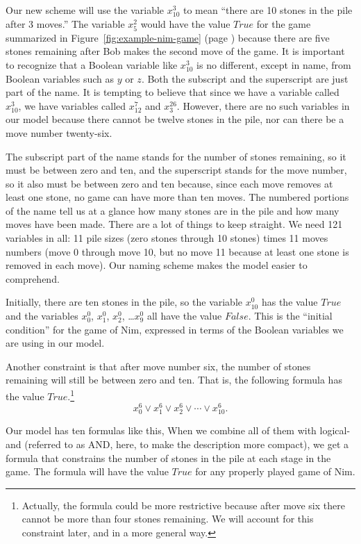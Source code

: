 {{Our new scheme will use the variable $x_{10}^{3}$ to mean
``there are 10 stones in the pile after 3 moves.''
The variable $x_{5}^{2}$ would have the value $True$
for the game summarized in
Figure~\ref{fig:example-nim-game} (page \pageref{fig:example-nim-game})
because there are five stones remaining after Bob makes the
second move of the game.
It is important to recognize that a Boolean variable like $x_{10}^{3}$
is no different, except in name, from Boolean variables such as $y$ or $z$.
Both the subscript and the superscript are just part of the name.
It is tempting to believe that since we have a variable called $x_{10}^{3}$,
we have variables called $x_{12}^{7}$ and $x_{3}^{26}$.
However, there are no such variables in our model because there cannot be twelve stones
in the pile, nor can there be a move number twenty-six.

The subscript part of the name stands for the number of stones remaining,
so it must be between zero and ten, and the superscript stands for the
move number, so it also must be between zero and ten because,
since each move removes at least one stone, no game can have more than ten moves.
The numbered portions of the name tell us at
a glance how many stones are in the pile
and how many moves have been made.
There are a lot of things to keep straight.
We need 121 variables in all: 11 pile sizes (zero stones through 10 stones)
times 11 moves numbers (move 0 through move 10,
but no move 11 because at least one stone is removed in each move).
Our naming scheme makes the model easier to comprehend.

Initially, there are ten stones in the pile,
so the variable  $x_{10}^{0}$ has the value $True$
and the variables $x_{0}^{0}$, $x_{1}^{0}$, $x_{2}^{0}$, \dots $x_{9}^{0}$
all have the value $False$.
This is the ``initial condition'' for the game of Nim,
expressed in terms of the Boolean variables we are using
in our model.

Another constraint is that after move number six,
the number of stones remaining will still be between zero and ten.
That is, the following formula has the value $True$.\footnote{Actually,
the formula could be more restrictive because
after move six there cannot be more than four stones remaining.
We will account for this constraint later, and in a more general way.}
$$x_{0}^{6} \vee x_{1}^{6} \vee x_{2}^{6} \vee \cdots \vee x_{10}^{6}.$$

Our model has ten formulas like this,
When we combine all of them with logical-and
(referred to as AND, here, to make the description more compact),
we get a formula that constrains the number of stones
in the pile at each stage in the game.
The formula will have the value $True$ for any properly played game of Nim.

}}
